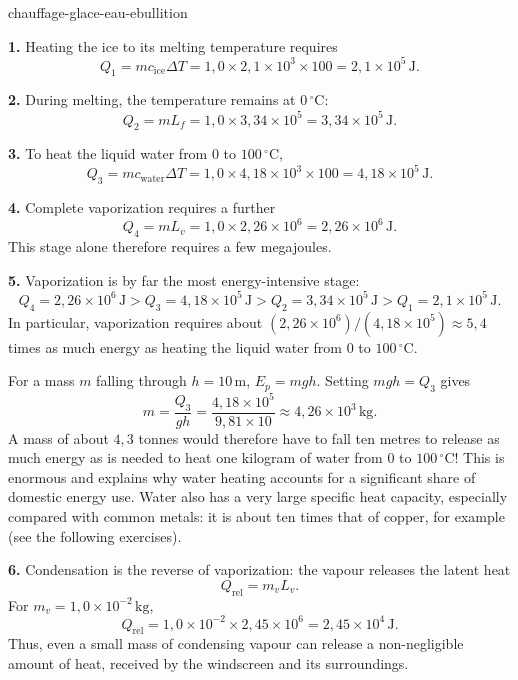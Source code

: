 \begin{exo}{chauffage-glace-eau-ebullition}
\begin{solution}
\textbf{1.} Heating the ice to its melting temperature requires
\[
Q_1=mc_{\text{ice}}\Delta T
=1{,}0\times2{,}1\times10^3\times100
=2{,}1\times10^5\,\text{J}.
\]

\textbf{2.} During melting, the temperature remains at $0\,{}^\circ\text{C}$:
\[
Q_2=mL_f=1{,}0\times3{,}34\times10^5
=3{,}34\times10^5\,\text{J}.
\]

\textbf{3.} To heat the liquid water from $0$ to $100\,{}^\circ\text{C}$,
\[
Q_3=mc_{\text{water}}\Delta T
=1{,}0\times4{,}18\times10^3\times100
=4{,}18\times10^5\,\text{J}.
\]

\textbf{4.} Complete vaporization requires a further
\[
Q_4=mL_v=1{,}0\times2{,}26\times10^6
=2{,}26\times10^6\,\text{J}.
\]
This stage alone therefore requires a few megajoules.

\textbf{5.} Vaporization is by far the most energy-intensive stage:
\[
Q_4=2{,}26\times10^6\,\text{J}
>Q_3=4{,}18\times10^5\,\text{J}
>Q_2=3{,}34\times10^5\,\text{J}
>Q_1=2{,}1\times10^5\,\text{J}.
\]
In particular, vaporization requires about $(2{,}26\times10^6)/(4{,}18\times10^5)\approx5{,}4$ times as much energy as heating the liquid water from $0$ to $100\,{}^\circ\text{C}$.

For a mass $m$ falling through $h=10\,\text{m}$, $E_p=mgh$. Setting $mgh=Q_3$ gives
\[
m=\frac{Q_3}{gh}
=\frac{4{,}18\times10^5}{9{,}81\times10}
\approx4{,}26\times10^3\,\text{kg}.
\]
A mass of about $4{,}3$ tonnes would therefore have to fall ten metres to release as much energy as is needed to heat one kilogram of water from $0$ to $100\,{}^\circ\text{C}$! This is enormous and explains why water heating accounts for a significant share of domestic energy use. Water also has a very large specific heat capacity, especially compared with common metals: it is about ten times that of copper, for example (see the following exercises).

\textbf{6.} Condensation is the reverse of vaporization: the vapour releases the latent heat
\[
Q_{\text{rel}}=m_vL_v.
\]
For $m_v=1{,}0\times10^{-2}\,\text{kg}$,
\[
Q_{\text{rel}}=1{,}0\times10^{-2}\times2{,}45\times10^6
=2{,}45\times10^4\,\text{J}.
\]
Thus, even a small mass of condensing vapour can release a non-negligible amount of heat, received by the windscreen and its surroundings.
\end{solution}
\end{exo}

